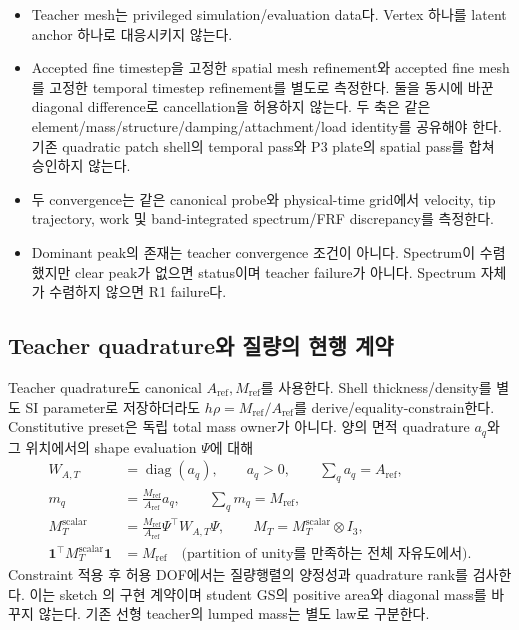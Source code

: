 \documentclass[10pt]{article}
\begin{document}
\begin{itemize}
  \item Teacher mesh는 privileged simulation/evaluation data다. Vertex 하나를 latent anchor 하나로 대응시키지 않는다.
  \item Accepted fine timestep을 고정한 spatial mesh refinement와 accepted fine mesh를 고정한 temporal timestep
  refinement를 별도로 측정한다. 둘을 동시에 바꾼 diagonal difference로 cancellation을 허용하지 않는다.
  두 축은 같은 element/mass/structure/damping/attachment/load identity를 공유해야 한다.
  기존 quadratic patch shell의 temporal pass와 P3 plate의 spatial pass를 합쳐 승인하지 않는다.
  \item 두 convergence는 같은 canonical probe와 physical-time grid에서 velocity, tip trajectory, work 및
  band-integrated spectrum/FRF discrepancy를 측정한다.
  \item Dominant peak의 존재는 teacher convergence 조건이 아니다. Spectrum이 수렴했지만 clear peak가 없으면
   status이며 teacher failure가 아니다. Spectrum 자체가 수렴하지 않으면 R1 failure다.
\end{itemize}

\subsection{Teacher quadrature와 질량의 현행 계약}
\label{sec:r1-mass}

Teacher quadrature도 canonical \(A_{\mathrm{ref}},M_{\mathrm{ref}}\)를 사용한다.
Shell thickness/density를 별도 SI parameter로 저장하더라도
\(h\rho=M_{\mathrm{ref}}/A_{\mathrm{ref}}\)를 derive/equality-constrain한다.
Constitutive preset은 독립 total mass owner가 아니다.
양의 면적 quadrature \(a_q\)와 그 위치에서의 shape evaluation \(\Psi\)에 대해
\begin{equation}
\begin{aligned}
 W_{A,T}&=\operatorname{diag}(a_q),\qquad a_q>0,\qquad \sum_q a_q=A_{\mathrm{ref}},\\
 m_q&=\frac{M_{\mathrm{ref}}}{A_{\mathrm{ref}}}a_q,\qquad \sum_q m_q=M_{\mathrm{ref}},\\
 M_T^{\mathrm{scalar}}&=\frac{M_{\mathrm{ref}}}{A_{\mathrm{ref}}}\Psi^\top W_{A,T}\Psi,
 \qquad M_T=M_T^{\mathrm{scalar}}\otimes I_3,\\
 \mathbf1^\top M_T^{\mathrm{scalar}}\mathbf1&=M_{\mathrm{ref}}
 \quad\text{(partition of unity를 만족하는 전체 자유도에서)}.
\end{aligned}
\label{eq:r1-consistent-mass}
\end{equation}
Constraint 적용 후 허용 DOF에서는 질량행렬의 양정성과 quadrature rank를 검사한다.
이는 sketch 의 구현 계약이며 student GS의 positive area와
diagonal mass를 바꾸지 않는다. 기존 선형 teacher의 lumped mass는 별도 law로 구분한다.
\end{document}
